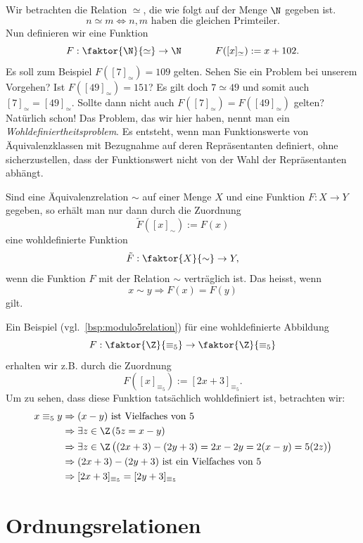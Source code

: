 \begin{rk}[Wohldefiniertheitsproblem]
Wir betrachten die Relation $\simeq$, die wie folgt auf der Menge $\N$ gegeben ist.
\[
n\simeq m\Leftrightarrow n,m\text{ haben die gleichen Primteiler}.
\]
Nun definieren wir eine Funktion
\[
F:\faktor{\N}{\simeq}\to \N\phantom{abstand}F([x]_\simeq):=x+102.
\]
Es soll zum Beispiel $F([7]_\simeq)=109$ gelten. Sehen Sie ein Problem bei unserem Vorgehen? Ist $F([49]_\simeq)=151$? Es gilt doch $7\simeq 49$ und somit auch $[7]_\simeq=[49]_\simeq$. Sollte dann nicht auch $F([7]_\simeq)=F([49]_\simeq)$ gelten? Natürlich schon! Das Problem, das wir hier haben, nennt man ein \textit{Wohldefiniertheitsproblem}. Es entsteht, wenn man Funktionswerte von Äquivalenzklassen mit Bezugnahme auf deren Repräsentanten definiert, ohne sicherzustellen, dass der Funktionswert nicht von der Wahl der Repräsentanten abhängt.

Sind eine Äquivalenzrelation $\sim$ auf einer Menge $X$ und eine Funktion $F:X\to Y$ gegeben, so erhält man nur dann durch die Zuordnung
\[
\tilde F([x]_\sim):=F(x)
\]
eine wohldefinierte Funktion
\[
\tilde F:\faktor{X}{\sim}\to Y,
\]
wenn die Funktion $F$ mit der Relation $\sim$ verträglich ist. Das heisst, wenn
\[
x\sim y\Rightarrow F(x)=F(y)
\]
gilt.
\end{rk}

\begin{bsp}
Ein Beispiel (vgl.~\ref{bsp:modulo5relation}) für eine wohldefinierte Abbildung
\[
F:\faktor{\Z}{\equiv_5}\to\faktor{\Z}{\equiv_5}
\]
erhalten wir z.B. durch die Zuordnung
\[
F([x]_{\equiv_5}):=[2x+3]_{\equiv_5}.
\]
Um zu sehen, dass diese Funktion tatsächlich wohldefiniert ist, betrachten wir:
\begin{align*}
x\equiv_5 y&\Rightarrow (x-y)\text{ ist Vielfaches von } 5\\
&\Rightarrow\exists z\in\Z\,(5z=x-y)\\
&\Rightarrow \exists z\in\Z\,\big((2x+3)-(2y+3)=2x-2y=2(x-y)=5(2z)\big)\\
&\Rightarrow (2x+3)-(2y+3)\text{ ist ein Vielfaches von }5\\
&\Rightarrow [2x+3]_{\equiv_5}=[2y+3]_{\equiv_5}\\
\end{align*}
\end{bsp}


\section{Ordnungsrelationen}

